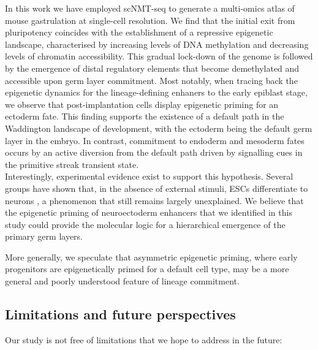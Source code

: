 In this work we have employed scNMT-seq to generate a multi-omics atlas of mouse gastrulation at single-cell resolution. We find that the initial exit from pluripotency coincides with the establishment of a repressive epigenetic landscape, characterised by increasing levels of DNA methylation and decreasing levels of chromatin accessibility. This gradual lock-down of the genome is followed by the emergence of distal regulatory elements that become demethylated and accessible upon germ layer commitment. Most notably, when tracing back the epigenetic dynamics for the lineage-defining enhaners to the early epiblast stage, we observe that post-implantation cells display epigenetic priming for an ectoderm fate. This finding supports the existence of a default path in the Waddington landscape of development, with the ectoderm being the default germ layer in the embryo. In contrast, commitment to endoderm and mesoderm fates occurs by an active diversion from the default path driven by signalling cues in the primitive streak transient state.\\
Interestingly, experimental evidence exist to support this hypothesis. Several groups have shown that, in the absence of external stimuli, ESCs differentiate to neurons \cite{Munoz2002,Hemmati-Brivanlou1997}, a phenomenon that still remains largely unexplained. We believe that the epigenetic priming of neuroectoderm enhancers that we identified in this study could provide the molecular logic for a hierarchical emergence of the primary germ layers.

More generally, we speculate that asymmetric epigenetic priming, where early progenitors are epigenetically primed for a default cell type, may be a more general and poorly understood feature of lineage commitment. 

\subsection{Limitations and future perspectives}

Our study is not free of limitations that we hope to address in the future:

